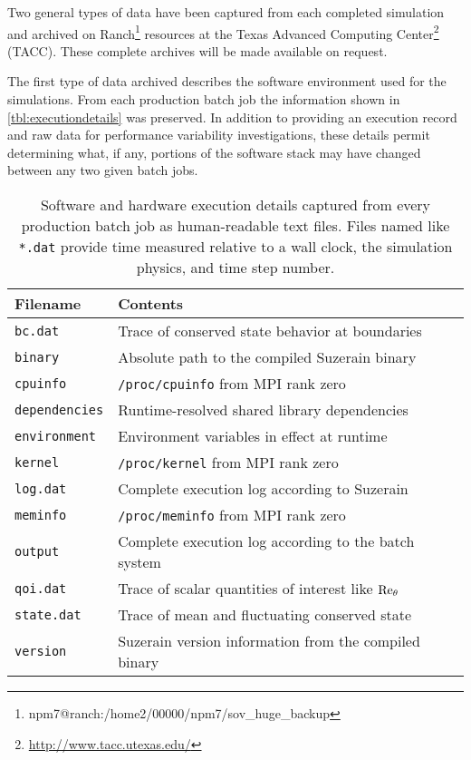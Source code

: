 \label{sec:archiving}


Two general types of data have been captured from each completed
simulation and archived on 
Ranch\footnote{npm7@ranch:/home2/00000/npm7/sov\_huge\_backup}
resources at the Texas Advanced Computing Center\footnote{%
    \url{http://www.tacc.utexas.edu/}
}
(TACC).  These complete archives will be made available on request. 

The first type of data archived describes the software environment used for the
simulations.  From each production batch job the information shown in
\autoref{tbl:executiondetails} was preserved.
%
In addition to providing an execution record and raw data for performance
variability investigations, these details permit determining what, if any,
portions of the software stack may have changed between any two given batch
jobs.

\begin{table}
\centering
\caption[Execution details captured from each production batch job]{%
  Software and hardware execution details captured from every production batch
  job as human-readable text files.  Files named like \texttt{*.dat} provide time
  measured relative to a wall clock, the simulation physics, and time step
  number.\label{tbl:executiondetails}
}
\begin{small}
\begin{tabular}{p{}|p{}}
Filename & Contents \\ \hline \hline
\texttt{bc.dat}       & Trace of conserved state behavior at boundaries \\
\texttt{binary}       & Absolute path to the compiled Suzerain binary \\
\texttt{cpuinfo}      & \texttt{/proc/cpuinfo} from MPI rank zero \\
\texttt{dependencies} & Runtime-resolved shared library dependencies \\
\texttt{environment}  & Environment variables in effect at runtime \\
\texttt{kernel}       & \texttt{/proc/kernel} from MPI rank zero \\
\texttt{log.dat}      & Complete execution log according to Suzerain \\
\texttt{meminfo}      & \texttt{/proc/meminfo} from MPI rank zero \\
\texttt{output}       & Complete execution log according to the batch system \\
\texttt{qoi.dat}      & Trace of scalar quantities of interest like $\Reynolds[\theta]{}$ \\
\texttt{state.dat}    & Trace of mean and fluctuating conserved state \\
\texttt{version}      & Suzerain version information from the compiled binary
\end{tabular}
\end{small}
\end{table}

